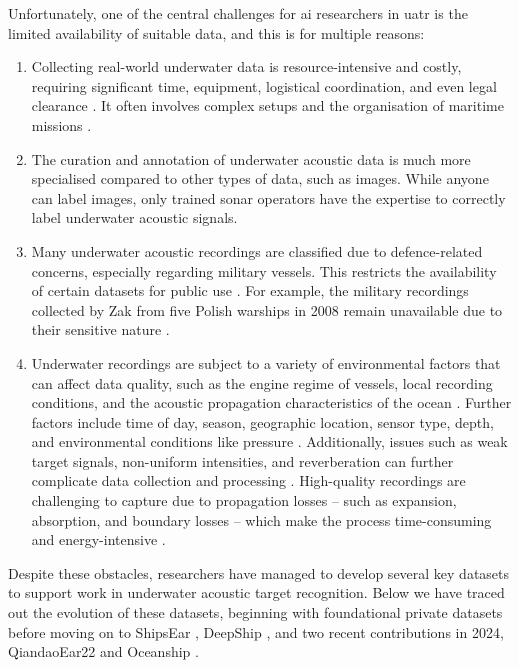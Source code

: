 Unfortunately, one of the central challenges for \acrshort{ai} researchers in \acrshort{uatr} is the limited availability of suitable data, and this is for multiple reasons:

\begin{enumerate}
    \item Collecting real-world underwater data is resource-intensive and costly, requiring significant time, equipment, logistical coordination, and even legal clearance \cite{irfan_deepship_2021}. It often involves complex setups and the organisation of maritime missions \cite{domingos_survey_2022}.
    \item The curation and annotation of underwater acoustic data is much more specialised compared to other types of data, such as images. While anyone can label images, only trained sonar operators have the expertise to correctly label underwater acoustic signals.
    \item Many underwater acoustic recordings are classified due to defence-related concerns, especially regarding military vessels. This restricts the availability of certain datasets for public use \cite{irfan_deepship_2021, domingos_survey_2022}. For example, the military recordings collected by Zak from five Polish warships in 2008 remain unavailable due to their sensitive nature \cite{zak_ships_2008}.
    \item Underwater recordings are subject to a variety of environmental factors that can affect data quality, such as the engine regime of vessels, local recording conditions, and the acoustic propagation characteristics of the ocean \cite{david_santos-dominguez_shipsear_2016}. Further factors include time of day, season, geographic location, sensor type, depth, and environmental conditions like pressure \cite{domingos_survey_2022, hovem_marine_2012}. Additionally, issues such as weak target signals, non-uniform intensities, and reverberation can further complicate data collection and processing \cite{luo_survey_2023}. High-quality recordings are challenging to capture due to propagation losses -- such as expansion, absorption, and boundary losses -- which make the process time-consuming and energy-intensive \cite{luo_survey_2023}.
\end{enumerate}

Despite these obstacles, researchers have managed to develop several key datasets to support work in underwater acoustic target recognition. Below we have traced out the evolution of these datasets, beginning with foundational private datasets before moving on to ShipsEar \cite{david_santos-dominguez_shipsear_2016}, DeepShip \cite{irfan_deepship_2021}, and two recent contributions in 2024, QiandaoEar22 \cite{du_qiandaoear22_2024} and Oceanship \cite{huang_oceanship_2024}.


